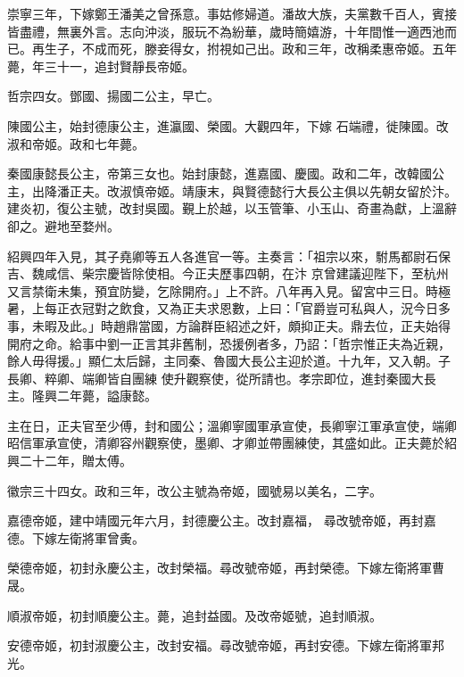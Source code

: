 \begin{pinyinscope}
 崇寧三年，下嫁鄭王潘美之曾孫意。事姑修婦道。潘故大族，夫黨數千百人，賓接皆盡禮，無裏外言。志向沖淡，服玩不為紛華，歲時簡嬉游，十年間惟一適西池而已。再生子，不成而死，滕妾得女，拊視如己出。政和三年，改稱柔惠帝姬。五年薨，年三十一，追封賢靜長帝姬。



 哲宗四女。鄧國、揚國二公主，早亡。



 陳國公主，始封德康公主，進瀛國、榮國。大觀四年，下嫁
 石端禮，徙陳國。改淑和帝姬。政和七年薨。



 秦國康懿長公主，帝第三女也。始封康懿，進嘉國、慶國。政和二年，改韓國公主，出降潘正夫。改淑慎帝姬。靖康末，與賢德懿行大長公主俱以先朝女留於汴。建炎初，復公主號，改封吳國。覲上於越，以玉管筆、小玉山、奇畫為獻，上溫辭卻之。避地至婺州。



 紹興四年入見，其子堯卿等五人各進官一等。主奏言：「祖宗以來，駙馬都尉石保吉、魏咸信、柴宗慶皆除使相。今正夫歷事四朝，在汴
 京曾建議迎陛下，至杭州又言禁衛未集，預宜防變，乞除開府。」上不許。八年再入見。留宮中三日。時極暑，上每正衣冠對之飲食，又為正夫求恩數，上曰：「官爵豈可私與人，況今日多事，未暇及此。」時趙鼎當國，方論群臣紹述之奸，頗抑正夫。鼎去位，正夫始得開府之命。給事中劉一正言其非舊制，恐援例者多，乃詔：「哲宗惟正夫為近親，餘人毋得援。」顯仁太后歸，主同秦、魯國大長公主迎於道。十九年，又入朝。子長卿、粹卿、端卿皆自團練
 使升觀察使，從所請也。孝宗即位，進封秦國大長主。隆興二年薨，謚康懿。



 主在日，正夫官至少傅，封和國公；溫卿寧國軍承宣使，長卿寧江軍承宣使，端卿昭信軍承宣使，清卿容州觀察使，墨卿、才卿並帶團練使，其盛如此。正夫薨於紹興二十二年，贈太傅。



 徽宗三十四女。政和三年，改公主號為帝姬，國號易以美名，二字。



 嘉德帝姬，建中靖國元年六月，封德慶公主。改封嘉福，
 尋改號帝姬，再封嘉德。下嫁左衛將軍曾夤。



 榮德帝姬，初封永慶公主，改封榮福。尋改號帝姬，再封榮德。下嫁左衛將軍曹晟。



 順淑帝姬，初封順慶公主。薨，追封益國。及改帝姬號，追封順淑。



 安德帝姬，初封淑慶公主，改封安福。尋改號帝姬，再封安德。下嫁左衛將軍邦光。




\end{pinyinscope}
